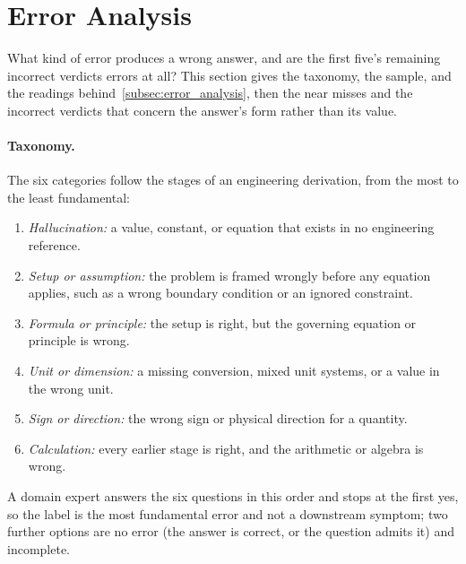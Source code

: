 \section{Error Analysis}
\label{appendix:error_analysis}

What kind of error produces a wrong answer, and are the first five's remaining incorrect verdicts
errors at all?
This section gives the taxonomy, the sample, and the readings
behind~\autoref{subsec:error_analysis}, then the near misses and the incorrect verdicts that
concern the answer's form rather than its value.

\paragraph{Taxonomy.} The six categories follow the stages of an engineering derivation, from the
most to the least fundamental:
\begin{enumerate}[nosep, leftmargin=*]
\item \emph{Hallucination:} a value, constant, or equation that exists in no engineering reference.
\item \emph{Setup or assumption:} the problem is framed wrongly before any equation applies, such as
a wrong boundary condition or an ignored constraint.
\item \emph{Formula or principle:} the setup is right, but the governing equation or principle is
wrong.
\item \emph{Unit or dimension:} a missing conversion, mixed unit systems, or a value in the wrong
unit.
\item \emph{Sign or direction:} the wrong sign or physical direction for a quantity.
\item \emph{Calculation:} every earlier stage is right, and the arithmetic or algebra is wrong.
\end{enumerate}
A domain expert answers the six questions in this order and stops at the first yes, so the label is
the most fundamental error and not a downstream symptom; two further options are no error (the
answer is correct, or the question admits it) and incomplete.

